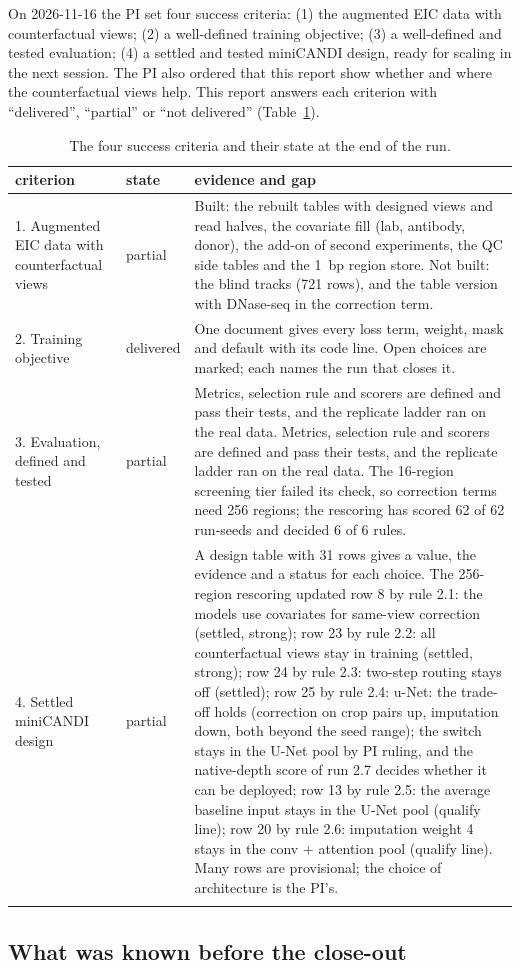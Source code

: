 \documentclass[pdflatex,sn-mathphys-num]{sn-jnl}
\newcommand{\lit}[1]{#1}
\newcommand{\cl}[1]{#1}
\newcommand{\blindRows}{721}
\newcommand{\nDesignRows}{31}
\newcommand{\rescoreCritFour}{The 256-region rescoring updated row 8 by rule 2.1: the models use covariates for same-view correction (settled, strong); row 23 by rule 2.2: all counterfactual views stay in training (settled, strong); row 24 by rule 2.3: two-step routing stays off (settled); row 25 by rule 2.4: u-Net: the trade-off holds (correction on crop pairs up, imputation down, both beyond the seed range); the switch stays in the U-Net pool by PI ruling, and the native-depth score of run 2.7 decides whether it can be deployed; row 13 by rule 2.5: the average baseline input stays in the U-Net pool (qualify line); row 20 by rule 2.6: imputation weight 4 stays in the conv + attention pool (qualify line). Many rows are provisional; the choice of architecture is the PI's.}
\newcommand{\rescoreCritThree}{Metrics, selection rule and scorers are defined and pass their tests, and the replicate ladder ran on the real data. The 16-region screening tier failed its check, so correction terms need 256 regions; the rescoring has scored 62 of 62 run-seeds and decided 6 of 6 rules.}
\begin{document}
\cl{On \lit{2026-11-16} the PI set four success criteria: (\lit{1}) the augmented EIC data with counterfactual views; (\lit{2}) a well-defined training objective; (\lit{3}) a well-defined and tested evaluation; (\lit{4}) a settled and tested miniCANDI design, ready for scaling in the next session. The PI also ordered that this report show whether and where the counterfactual views help. This report answers each criterion with ``delivered'', ``partial'' or ``not delivered'' (Table~\ref{tab:criteria}).}

\begin{table}[!htbp]
\caption{\cl{The four success criteria and their state at the end of the run.}}\label{tab:criteria}
\footnotesize
\begin{tabular}{p{3.3cm}p{1.5cm}p{7.4cm}}
\toprule
criterion & state & evidence and gap \\
\midrule
\lit{1}. Augmented EIC data with counterfactual views & partial & Built: the rebuilt tables with designed views and read halves, the covariate fill (lab, antibody, donor), the add-on of second experiments, the QC side tables and the \lit{1}~bp region store. Not built: the blind tracks (\blindRows{} rows), and the table version with DNase-seq in the correction term. \\
\lit{2}. Training objective & delivered & One document gives every loss term, weight, mask and default with its code line. Open choices are marked; each names the run that closes it. \\
\lit{3}. Evaluation, defined and tested & partial & Metrics, selection rule and scorers are defined and pass their tests, and the replicate ladder ran on the real data. \rescoreCritThree{} \\
\lit{4}. Settled miniCANDI design & partial & A design table with \nDesignRows{} rows gives a value, the evidence and a status for each choice. \rescoreCritFour{} \\
\botrule
\end{tabular}
\end{table}

\subsection{What was known before the close-out}
\end{document}
